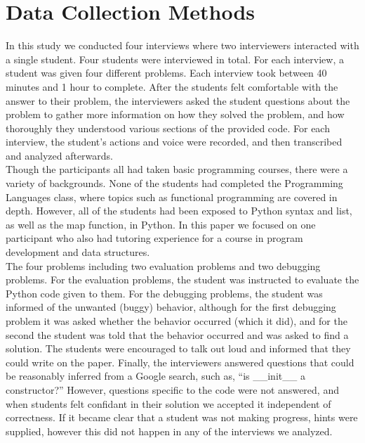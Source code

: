 \section{Data Collection Methods}


In this study we conducted four interviews where two interviewers interacted with a single student. Four students were interviewed in total.
For each interview, a student was given four different problems. Each interview took between 40 minutes and 1 hour to complete.
After the students felt comfortable with the answer to their problem,
 the interviewers asked the student questions about the problem to gather more information on how they solved the problem,
 and how thoroughly they understood various sections of the provided code.
For each interview, the student's actions and voice were recorded, and then transcribed and analyzed afterwards. \\

Though the participants all had taken basic programming courses, there were a variety of backgrounds.
None of the students had completed the Programming Languages class, where topics such as functional programming are covered in depth.
However, all of the students had been exposed to Python syntax and list, as well as the map function, in Python.
In this paper we focused on one participant who also had tutoring experience for a course in program development and data structures. \\

The four problems including two evaluation problems and two debugging problems.
For the evaluation problems, the student was instructed to evaluate the Python code given to them.
For the debugging problems, the student was informed of the unwanted (buggy) behavior,
 although for the first debugging problem it was asked whether the behavior occurred (which it did),
 and for the second the student was told that the behavior occurred and was asked to find a solution.
The students were encouraged to talk out loud and informed that they could write on the paper.
Finally, the interviewers answered questions that could be reasonably inferred from a Google search, such as,
``is \_\_init\_\_ a constructor?''
However, questions specific to the code were not answered, and when students felt confidant in their solution we accepted it independent of correctness.
If it became clear that a student was not making progress, hints were supplied, however this did not happen in any of the interviews we analyzed.

\newpage
